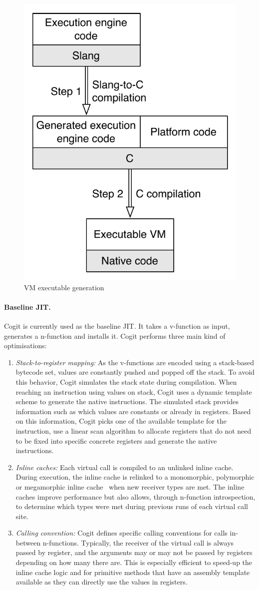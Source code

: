 \documentclass[a4paper,12pt,twoside]{../includes/ThesisStyle}
\begin{document}
\begin{figure}[h!]
    \begin{center}
        \includegraphics[width=0.45\linewidth]{VMCompilation}
        \caption{VM executable generation}
        \label{fig:VMCompilation}
    \end{center}
\end{figure}

\paragraph{Baseline JIT.}
Cogit is currently used as the baseline JIT. It takes a v-function as input, generates a n-function and installs it. Cogit performs three main kind of optimisations:
\begin{enumerate}
	\item \emph{Stack-to-register mapping:} As the v-functions are encoded using a stack-based bytecode set, values are constantly pushed and popped off the stack. To avoid this behavior, Cogit simulates the stack state during compilation. When reaching an instruction using values on stack, Cogit uses a dynamic template scheme to generate the native instructions. The simulated stack provides information such as which values are constants or already in registers. Based on this information, Cogit picks one of the available template for the instruction, use a linear scan algorithm to allocate registers that do not need to be fixed into specific concrete registers and generate the native instructions.
	\item \emph{Inline caches:} Each virtual call is compiled to an unlinked inline cache. During execution, the inline cache is relinked to a monomorphic, polymorphic or megamorphic inline cache~\cite{Deut84a,Holz91a} when new receiver types are met. The inline caches improve performance but also allows, through n-function introspection, to determine which types were met during previous runs of each virtual call site.
	\item \emph{Calling convention:} Cogit defines specific calling conventions for calls in-between n-functions. Typically, the receiver of the virtual call is always passed by register, and the arguments may or may not be passed by registers depending on how many there are. This is especially efficient to speed-up the inline cache logic and for primitive methods that have an assembly template available as they can directly use the values in registers.
\end{enumerate}
\end{document}
